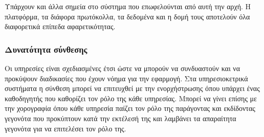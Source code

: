 Υπάρχουν και άλλα σημεία στο σύστημα που επωφελούνται από αυτή 
την αρχή. Η πλατφόρμα, τα διάφορα πρωτόκολλα, τα δεδομένα και η δομή 
τους αποτελούν όλα διαφορετικά επίπεδα αφαρετικότητας.

\subsubsection{Δυνατότητα σύνθεσης}

Οι υπηρεσίες είναι σχεδιασμένες έτσι ώστε να μπορούν να 
συνδυαστούν και να προκύψουν διαδικασίες που έχουν νόημα για την 
εφαρμογή. Στα υπηρεσιοκετρικά συστήματα η σύνθεση μπορεί να επιτευχθεί 
με την ενορχήστρωσης όπου υπάρχει ένας καθοδηγητής που καθορίζει τον 
ρόλο της κάθε υπηρεσίας. Μπορεί να γίνει επίσης με την χορογραφία όπου 
κάθε υπηρεσία παίζει τον ρόλο της παράγοντας και εκδίδοντας γεγονότα που 
προκύπτουν κατά την εκτέλεσή της και λαμβάνει τα απαραίτητα γεγονότα για 
να επιτελέσει τον ρόλο της.
